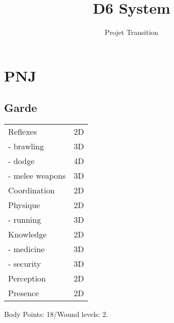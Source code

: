 \documentclass[10pt,a4paper]{article}
\author{Projet Transition}
\title{D6 System}
\begin{document}
\section{PNJ}
\subsection*{Garde}
\begin{tabular}{l|l}
Reflexes & 2D \\
- brawling & 3D\\
- dodge & 4D\\
- melee weapons & 3D\\
\hline
Coordination & 2D\\
\hline
Physique & 2D\\
- running & 3D\\
\hline
Knowledge & 2D\\
- medicine & 3D\\
- security & 3D\\
\hline
Perception & 2D\\
\hline
Presence & 2D
\end{tabular}
Body Points: 18/Wound levels: 2.
\end{document}
